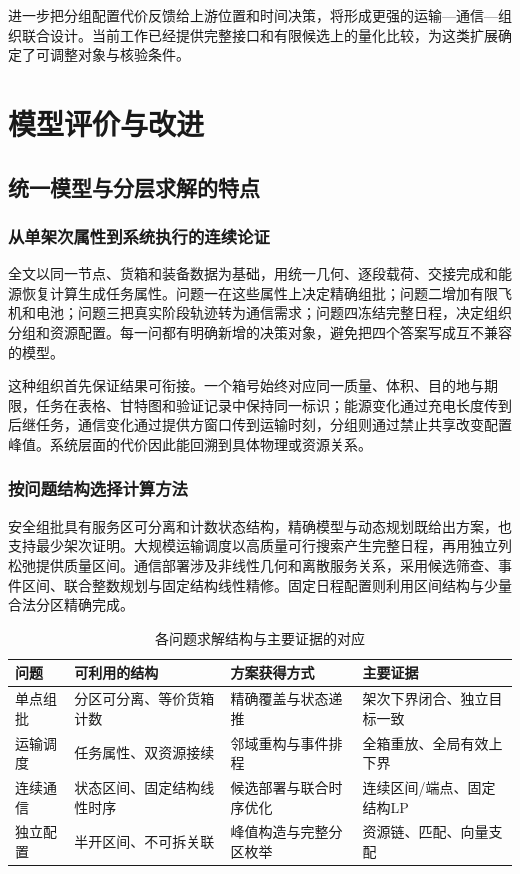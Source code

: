 \documentclass[withoutpreface,colorprint]{format}
\numberwithin{equation}{section}
\numberwithin{figure}{section}
\numberwithin{table}{section}
\begin{document}
进一步把分组配置代价反馈给上游位置和时间决策，将形成更强的运输—通信—组织联合设计。当前工作已经提供完整接口和有限候选上的量化比较，为这类扩展确定了可调整对象与核验条件。



\section{模型评价与改进}
\label{sec:evaluation}
\subsection{统一模型与分层求解的特点}
\subsubsection{从单架次属性到系统执行的连续论证}
全文以同一节点、货箱和装备数据为基础，用统一几何、逐段载荷、交接完成和能源恢复计算生成任务属性。问题一在这些属性上决定精确组批；问题二增加有限飞机和电池；问题三把真实阶段轨迹转为通信需求；问题四冻结完整日程，决定组织分组和资源配置。每一问都有明确新增的决策对象，避免把四个答案写成互不兼容的模型。

这种组织首先保证结果可衔接。一个箱号始终对应同一质量、体积、目的地与期限，任务在表格、甘特图和验证记录中保持同一标识；能源变化通过充电长度传到后继任务，通信变化通过提供方窗口传到运输时刻，分组则通过禁止共享改变配置峰值。系统层面的代价因此能回溯到具体物理或资源关系。

\subsubsection{按问题结构选择计算方法}
安全组批具有服务区可分离和计数状态结构，精确模型与动态规划既给出方案，也支持最少架次证明。大规模运输调度以高质量可行搜索产生完整日程，再用独立列松弛提供质量区间。通信部署涉及非线性几何和离散服务关系，采用候选筛查、事件区间、联合整数规划与固定结构线性精修。固定日程配置则利用区间结构与少量合法分区精确完成。

\begin{table}[htbp]\centering\small
\caption{各问题求解结构与主要证据的对应}\label{tab:evidence_levels}
\begin{tabularx}{\linewidth}{p{1.5cm}LLL}\toprule
问题 & 可利用的结构 & 方案获得方式 & 主要证据\\\midrule
单点组批 & 分区可分离、等价货箱计数 & 精确覆盖与状态递推 & 架次下界闭合、独立目标一致\\
运输调度 & 任务属性、双资源接续 & 邻域重构与事件排程 & 全箱重放、全局有效上下界\\
连续通信 & 状态区间、固定结构线性时序 & 候选部署与联合时序优化 & 连续区间/端点、固定结构LP\\
独立配置 & 半开区间、不可拆关联 & 峰值构造与完整分区枚举 & 资源链、匹配、向量支配\\\bottomrule
\end{tabularx}\end{table}
\end{document}
